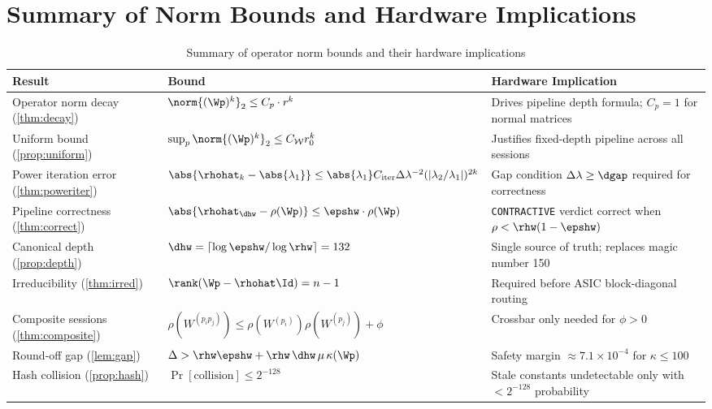 \documentclass[12pt,letterpaper]{article}
\theoremstyle{plain}
\theoremstyle{definition}
\theoremstyle{remark}
\begin{document}
\section{Summary of Norm Bounds and Hardware Implications}
\label{sec:summary}

\begin{table}[H]
\centering
\caption{Summary of operator norm bounds and their hardware implications}
\label{tab:summary}
\begin{tabular}{p{3.8cm} p{5cm} p{4.5cm}}
\toprule
\textbf{Result} & \textbf{Bound} & \textbf{Hardware Implication} \\
\midrule
Operator norm decay (\cref{thm:decay})
  & \(\norm{(\Wp)^k}_2 \leq C_p \cdot r^k\)
  & Drives pipeline depth formula; \(C_p = 1\) for normal matrices \\[4pt]
Uniform bound (\cref{prop:uniform})
  & \(\sup_p \norm{(\Wp)^k}_2 \leq C_{\mathcal{W}} r_0^k\)
  & Justifies fixed-depth pipeline across all sessions \\[4pt]
Power iteration error (\cref{thm:poweriter})
  & \(\abs{\rhohat_k - \abs{\lambda_1}} \leq \abs{\lambda_1} C_{\mathrm{iter}} \Delta\lambda^{-2} (|\lambda_2/\lambda_1|)^{2k}\)
  & Gap condition \(\Delta\lambda \geq \dgap\) required for correctness \\[4pt]
Pipeline correctness (\cref{thm:correct})
  & \(\abs{\rhohat_{\dhw} - \rho(\Wp)} \leq \epshw \cdot \rho(\Wp)\)
  & \texttt{CONTRACTIVE} verdict correct when \(\rho < \rhw(1-\epshw)\) \\[4pt]
Canonical depth (\cref{prop:depth})
  & \(\dhw = \lceil \log\epshw / \log\rhw \rceil = 132\)
  & Single source of truth; replaces magic number 150 \\[4pt]
Irreducibility (\cref{thm:irred})
  & \(\rank(\Wp - \rhohat\Id) = n-1\)
  & Required before ASIC block-diagonal routing \\[4pt]
Composite sessions (\cref{thm:composite})
  & \(\rho(W^{(p_ip_j)}) \leq \rho(W^{(p_i)})\rho(W^{(p_j)}) + \phi\)
  & Crossbar only needed for \(\phi > 0\) \\[4pt]
Round-off gap (\cref{lem:gap})
  & \(\Delta > \rhw\epshw + \rhw\,\dhw\,\mu\,\kappa(\Wp)\)
  & Safety margin \(\approx 7.1 \times 10^{-4}\) for \(\kappa \leq 100\) \\[4pt]
Hash collision (\cref{prop:hash})
  & \(\Pr[\text{collision}] \leq 2^{-128}\)
  & Stale constants undetectable only with \(< 2^{-128}\) probability \\
\bottomrule
\end{tabular}
\end{table}
\end{document}
